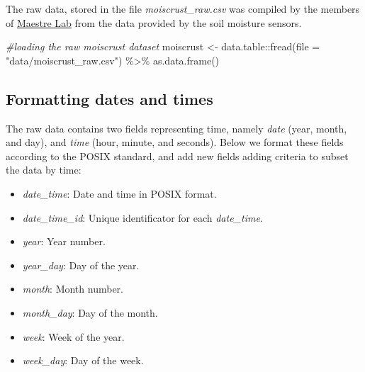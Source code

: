 \documentclass[
  table]{article}
\newenvironment{Shaded}{\begin{snugshade}}{\end{snugshade}}
\newcommand{\AttributeTok}[1]{\textcolor[rgb]{0.77,0.63,0.00}{#1}}
\newcommand{\CommentTok}[1]{\textcolor[rgb]{0.56,0.35,0.01}{\textit{#1}}}
\newcommand{\FunctionTok}[1]{\textcolor[rgb]{0.00,0.00,0.00}{#1}}
\newcommand{\NormalTok}[1]{#1}
\newcommand{\OtherTok}[1]{\textcolor[rgb]{0.56,0.35,0.01}{#1}}
\newcommand{\SpecialCharTok}[1]{\textcolor[rgb]{0.00,0.00,0.00}{#1}}
\newcommand{\StringTok}[1]{\textcolor[rgb]{0.31,0.60,0.02}{#1}}
\providecommand{\tightlist}{%
  \setlength{\itemsep}{0pt}\setlength{\parskip}{0pt}}
\begin{document}
The raw data, stored in the file \emph{moiscrust\_raw.csv} was compiled
by the members of \href{https://maestrelab.com/en/}{Maestre Lab} from
the data provided by the soil moisture sensors.

\begin{Shaded}
\begin{Highlighting}[]
\CommentTok{\#loading the raw moiscrust dataset}
\NormalTok{moiscrust }\OtherTok{\textless{}{-}}\NormalTok{ data.table}\SpecialCharTok{::}\FunctionTok{fread}\NormalTok{(}\AttributeTok{file =} \StringTok{"data/moiscrust\_raw.csv"}\NormalTok{) }\SpecialCharTok{\%\textgreater{}\%} 
  \FunctionTok{as.data.frame}\NormalTok{()}
\end{Highlighting}
\end{Shaded}

\hypertarget{formatting-dates-and-times}{%
\subsection{Formatting dates and
times}\label{formatting-dates-and-times}}

The raw data contains two fields representing time, namely \emph{date}
(year, month, and day), and \emph{time} (hour, minute, and seconds).
Below we format these fields according to the POSIX standard, and add
new fields adding criteria to subset the data by time:

\begin{itemize}
\tightlist
\item
  \emph{date\_time}: Date and time in POSIX format.
\item
  \emph{date\_time\_id}: Unique identificator for each
  \emph{date\_time}.
\item
  \emph{year}: Year number.
\item
  \emph{year\_day}: Day of the year.
\item
  \emph{month}: Month number.
\item
  \emph{month\_day}: Day of the month.
\item
  \emph{week}: Week of the year.
\item
  \emph{week\_day}: Day of the week.
\end{itemize}
\end{document}
